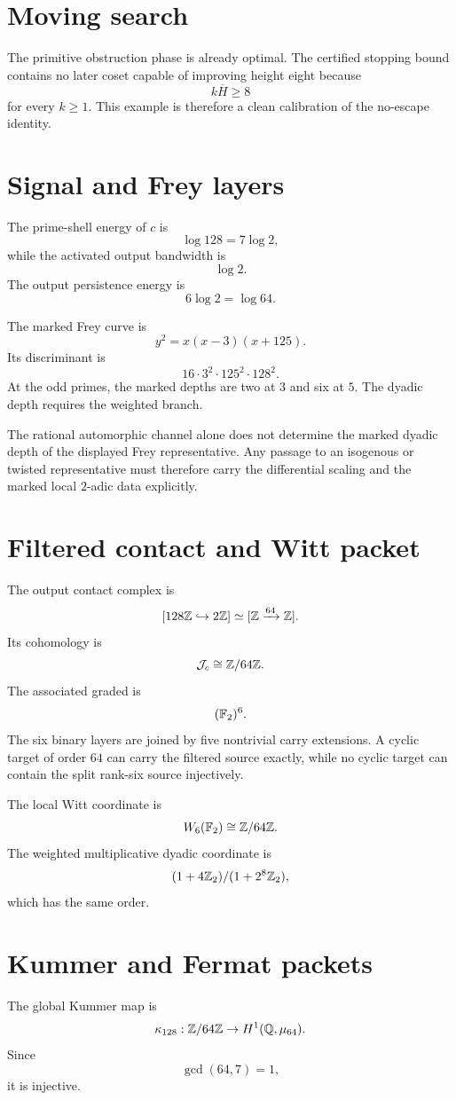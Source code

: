 \section{Moving search}
The primitive obstruction phase is already optimal. The certified stopping bound contains no later coset capable of improving height eight because
\[
 k\overline H\ge8
\]
for every $k\ge1$. This example is therefore a clean calibration of the no-escape identity.

\section{Signal and Frey layers}
The prime-shell energy of $c$ is
\[
 \log128=7\log2,
\]
while the activated output bandwidth is
\[
 \log2.
\]
The output persistence energy is
\[
 6\log2=\log64.
\]

The marked Frey curve is
\[
 y^2=x(x-3)(x+125).
\]
Its discriminant is
\[
 16\cdot3^2\cdot125^2\cdot128^2.
\]
At the odd primes, the marked depths are two at $3$ and six at $5$. The dyadic depth requires the weighted branch.

The rational automorphic channel alone does not determine the marked dyadic depth of the displayed Frey representative. Any passage to an isogenous or twisted representative must therefore carry the differential scaling and the marked local $2$-adic data explicitly.

\section{Filtered contact and Witt packet}
The output contact complex is
\[
 [128\mathbb Z\hookrightarrow2\mathbb Z]
 \simeq
 [\mathbb Z\xrightarrow{64}\mathbb Z].
\]
Its cohomology is
\[
 \mathcal J_c\cong\mathbb Z/64\mathbb Z.
\]
The associated graded is
\[
 (\mathbb F_2)^6.
\]
The six binary layers are joined by five nontrivial carry extensions. A cyclic target of order $64$ can carry the filtered source exactly, while no cyclic target can contain the split rank-six source injectively.

The local Witt coordinate is
\[
 W_6(\mathbb F_2)
 \cong
 \mathbb Z/64\mathbb Z.
\]
The weighted multiplicative dyadic coordinate is
\[
 (1+4\mathbb Z_2)/(1+2^8\mathbb Z_2),
\]
which has the same order.

\section{Kummer and Fermat packets}
The global Kummer map is
\[
 \kappa_{128}:\mathbb Z/64\mathbb Z\to H^1(\mathbb Q,\mu_{64}).
\]
Since
\[
 \gcd(64,7)=1,
\]
it is injective.

